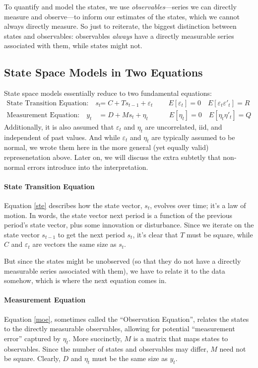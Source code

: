 \documentclass[a4paper,12pt]{article}
\begin{document}
To quantify and model the states, we use \emph{observables}---series we can directly measure and observe---to inform our estimates of the states, which we cannot always directly measure. So just to reiterate, the biggest distinction between states and observables: observables \emph{always} have a directly measurable series associated with them, while states might not.


\subsection{State Space Models in Two Equations}

State space models essentially reduce to two fundamental equations:
\begin{align}
  \text{State Transition Equation:} \quad
    s_{t} &= C + T s_{t-1} + \varepsilon_{t} \label{ste}\
    \quad\quad E[\varepsilon_t] = 0
    \quad E[\varepsilon_t \varepsilon'_t] =  R \\
  \text{Measurement Equation:} \quad
    y_{t} &= D + M s_{t} + \eta_{t} \label{moe}
    \quad\qquad E[\eta_t] =  0 
    \quad E[\eta_t \eta'_t] =  Q 
\end{align}
Additionally, it is also assumed that $\varepsilon_t$ and $\eta_t$ are uncorrelated, iid, and independent of past values. And while $\varepsilon_t$ and $\eta_t$ are typically assumed to be normal, we wrote them here in the more general (yet equally valid) represenetation above. Later on, we will discuss the extra subtetly that non-normal errors introduce into the interpretation.


\paragraph{State Transition Equation} Equation \ref{ste} describes how the state vector, $s_t$, evolves over time; it's a law of motion. In words, the state vector next period is a function of the previous period's state vector, plus some innovation or disturbance.  Since we iterate on the state vector $s_{t-1}$ to get the next period $s_{t}$, it's clear that $T$ must be square, while $C$ and $\varepsilon_t$ are vectors the same size as $s_t$.

But since the states might be unobserved (so that they do not have a directly measurable series associated with them), we have to relate it to the data somehow, which is where the next equation comes in.

\paragraph{Measurement Equation} Equation \ref{moe}, sometimes called the ``Observation Equation'', relates the states to the directly measurable observables, allowing for potential ``measurement error'' captured by $\eta_t$. More succinctly, $M$ is a matrix that maps states to observables. Since the number of states and observables may differ, $M$ need not be square. Clearly, $D$ and $\eta_t$ must be the same size as $y_t$.
\end{document}
